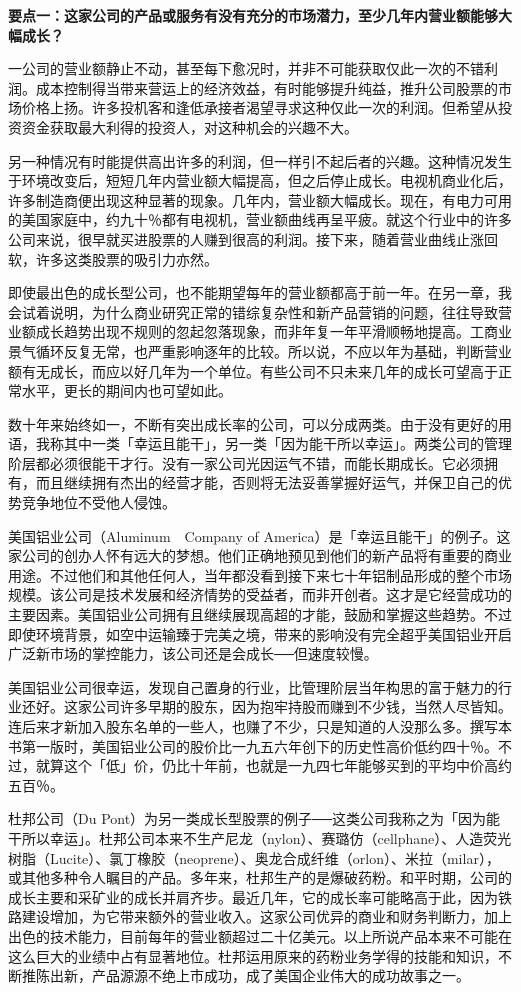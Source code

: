 \documentclass[UTF8,a4paper,zihao=-4,fontset = windows]{ctexart} %
\begin{document}
\textbf{要点一：这家公司的产品或服务有没有充分的市场潜力，至少几年内营业额能够大幅成长？}


一公司的营业额静止不动，甚至每下愈况时，并非不可能获取仅此一次的不错利润。成本控制得当带来营运上的经济效益，有时能够提升纯益，推升公司股票的市场价格上扬。许多投机客和逢低承接者渴望寻求这种仅此一次的利润。但希望从投资资金获取最大利得的投资人，对这种机会的兴趣不大。

另一种情况有时能提供高出许多的利润，但一样引不起后者的兴趣。这种情况发生于环境改变后，短短几年内营业额大幅提高，但之后停止成长。电视机商业化后，许多制造商便出现这种显著的现象。几年内，营业额大幅成长。现在，有电力可用的美国家庭中，约九十％都有电视机，营业额曲线再呈平疲。就这个行业中的许多公司来说，很早就买进股票的人赚到很高的利润。接下来，随着营业曲线止涨回软，许多这类股票的吸引力亦然。

即使最出色的成长型公司，也不能期望每年的营业额都高于前一年。在另一章，我会试着说明，为什么商业研究正常的错综复杂性和新产品营销的问题，往往导致营业额成长趋势出现不规则的忽起忽落现象，而非年复一年平滑顺畅地提高。工商业景气循环反复无常，也严重影响逐年的比较。所以说，不应以年为基础，判断营业额有无成长，而应以好几年为一个单位。有些公司不只未来几年的成长可望高于正常水平，更长的期间内也可望如此。

数十年来始终如一，不断有突出成长率的公司，可以分成两类。由于没有更好的用语，我称其中一类「幸运且能干」，另一类「因为能干所以幸运」。两类公司的管理阶层都必须很能干才行。没有一家公司光因运气不错，而能长期成长。它必须拥有，而且继续拥有杰出的经营才能，否则将无法妥善掌握好运气，并保卫自己的优势竞争地位不受他人侵蚀。

美国铝业公司（Aluminum　Company of America）是「幸运且能干」的例子。这家公司的创办人怀有远大的梦想。他们正确地预见到他们的新产品将有重要的商业用途。不过他们和其他任何人，当年都没看到接下来七十年铝制品形成的整个市场规模。该公司是技术发展和经济情势的受益者，而非开创者。这才是它经营成功的主要因素。美国铝业公司拥有且继续展现高超的才能，鼓励和掌握这些趋势。不过即使环境背景，如空中运输臻于完美之境，带来的影响没有完全超乎美国铝业开启广泛新市场的掌控能力，该公司还是会成长──但速度较慢。

美国铝业公司很幸运，发现自己置身的行业，比管理阶层当年构思的富于魅力的行业还好。这家公司许多早期的股东，因为抱牢持股而赚到不少钱，当然人尽皆知。连后来才新加入股东名单的一些人，也赚了不少，只是知道的人没那么多。撰写本书第一版时，美国铝业公司的股价比一九五六年创下的历史性高价低约四十％。不过，就算这个「低」价，仍比十年前，也就是一九四七年能够买到的平均中价高约五百％。

杜邦公司（Du Pont）为另一类成长型股票的例子──这类公司我称之为「因为能干所以幸运」。杜邦公司本来不生产尼龙（nylon）、赛璐仿（cellphane）、人造荧光树脂（Lucite）、氯丁橡胶（neoprene）、奥龙合成纤维（orlon）、米拉（milar），或其他多种令人瞩目的产品。多年来，杜邦生产的是爆破药粉。和平时期，公司的成长主要和采矿业的成长并肩齐步。最近几年，它的成长率可能略高于此，因为铁路建设增加，为它带来额外的营业收入。这家公司优异的商业和财务判断力，加上出色的技术能力，目前每年的营业额超过二十亿美元。以上所说产品本来不可能在这么巨大的业绩中占有显著地位。杜邦运用原来的药粉业务学得的技能和知识，不断推陈出新，产品源源不绝上市成功，成了美国企业伟大的成功故事之一。
\end{document}
